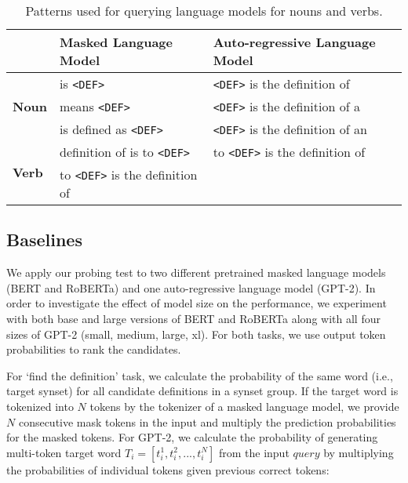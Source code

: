 \documentclass[11pt,a4paper]{article}
\begin{document}
\begin{table*}
\centering
\begin{tabular}{lll}
\hline
& \textbf{Masked Language Model} & \textbf{Auto-regressive Language Model}\\ \hline
\multirow{3}{*}{\textbf{Noun}} & \underline{\hspace{3mm}} is \texttt{<DEF>} & \texttt{<DEF>} is the definition of \underline{\hspace{3mm}} \\
 & \underline{\hspace{3mm}} means \texttt{<DEF>} & \texttt{<DEF>} is the definition of a \underline{\hspace{3mm}} \\
 & \underline{\hspace{3mm}} is defined as \texttt{<DEF>} & \texttt{<DEF>} is the definition of an \underline{\hspace{3mm}}\\ \hline
 \multirow{2}{*}{\textbf{Verb}} & definition of \underline{\hspace{3mm}} is to \texttt{<DEF>} & to \texttt{<DEF>} is the definition of \underline{\hspace{3mm}} \\
 & to \texttt{<DEF>} is the definition of \underline{\hspace{3mm}} & \\ \hline
 
\end{tabular}
\caption{Patterns used for querying language models for nouns and verbs.}
\label{tab:patterns}
\end{table*}

\subsection{Baselines}

We apply our probing test to two different pretrained masked language models (BERT and RoBERTa) and one auto-regressive language model (GPT-2). In order to investigate the effect of model size on the performance, we experiment with both base and large versions of BERT and RoBERTa along with all four sizes of GPT-2 (small, medium, large, xl). For both tasks, we use output token probabilities to rank the candidates. 

For `find the definition' task, we calculate the probability of the same word (i.e., target synset) for all candidate definitions in a synset group. If the target word is tokenized into $N$ tokens by the tokenizer of a masked language model, we provide $N$ consecutive mask tokens in the input and multiply the prediction probabilities for the masked tokens. For GPT-2, we calculate the probability of generating multi-token target word $T_i = [t_i^1,t_i^2,...,t_i^N]$ from the input $query$ by multiplying the probabilities of individual tokens given previous correct tokens:
\end{document}
